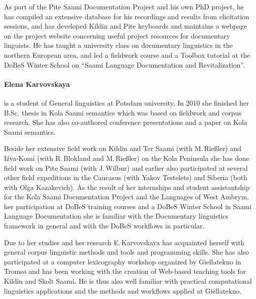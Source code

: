\documentclass[a4paper,12pt]{article}
\begin{document}
{{{{As part of the Pite Saami Documentation Project and his own PhD project, he has compiled an extensive database for his recordings and results from elicitation sessions, and has developed Kildin and Pite keyboards and maintains a webpage on the project website concerning useful project resources for documentary linguists. He has taught a university class on documentary linguistics in the northern European area, and led a fieldwork course and a Toolbox tutorial at the DoBeS Winter School on “Saami Language Documentation and Revitalization”.

\paragraph{Elena Karvovskaya} is a student of General linguistics at Potsdam university. In 2010 she finished her B.Sc. thesis in Kola Saami semantics which was based on fieldwork and corpus research. She has also co-authored conference presentations and a paper on Kola Saami semantics.

Beside her extensive field work on Kildin and Ter Saami (with M.\,Rießler) and Iźva-Komi (with R.\,Blokland and M.\,Rießler) on the Kola Peninsula she has done field work on Pite Saami (with J.\,Wilbur) and earlier also participated at several other field expeditions in the Caucasus (with Yakov Testelets) and Siberia (both with Olga Kazakevich). As the result of her internships and student assistantship for the Kola Saami Documentation Project and the Languages of West Ambrym, her participation at DoBeS training courses and a DoBeS Winter School in Saami Language Documentation she is familiar with the Documentary linguistics framework in general and with the DoBeS workflows in particular.

Due to her studies and her research E.\,Karvovskaya has acquainted herself with general corpus linguistic methods and tools and programming skills. She has also participated at a computer lexicography workshop organized by Giellatekno in Tromsø and has been working with the creation of Web-based teaching tools for Kildin and Skolt Saami. He is thus also well familiar with practical computational linguistics applications and the methods and workflows applied at Giellatekno.

}}}}
\end{document}
